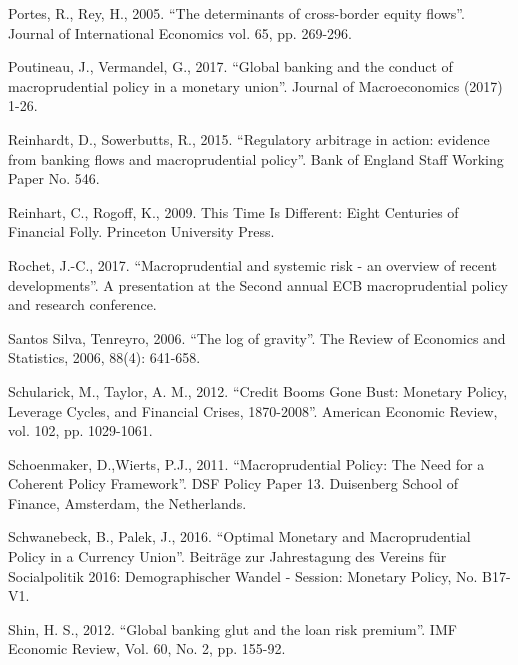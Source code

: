 \documentclass[12pt,a4paper]{article}
\begin{document}
Portes, R., Rey, H., 2005. “The determinants of cross-border equity flows”. Journal of International Economics vol. 65, pp. 269-296.

Poutineau, J., Vermandel, G., 2017. “Global banking and the conduct of macroprudential policy in a monetary union”. Journal of Macroeconomics (2017) 1-26.


Reinhardt, D., Sowerbutts, R., 2015. “Regulatory arbitrage in action: evidence from banking flows and macroprudential policy”. Bank of England Staff Working Paper No. 546.

Reinhart, C., Rogoff, K., 2009. This Time Is Different: Eight Centuries of Financial Folly. Princeton University Press.




Rochet, J.-C., 2017. “Macroprudential and systemic risk - an overview of recent developments”. A presentation at the Second annual ECB macroprudential policy and research conference. 

Santos Silva, Tenreyro, 2006. “The log of gravity”. The Review of Economics and Statistics, 2006, 88(4): 641-658.

Schularick, M., Taylor, A. M., 2012. “Credit Booms Gone Bust: Monetary Policy, Leverage Cycles, and Financial Crises, 1870-2008”. American Economic Review, vol. 102, pp. 1029-1061.

Schoenmaker, D.,Wierts, P.J., 2011. “Macroprudential Policy: The Need for a Coherent Policy Framework”. DSF Policy Paper 13. Duisenberg School of Finance, Amsterdam, the Netherlands.

Schwanebeck, B., Palek, J., 2016. “Optimal Monetary and Macroprudential Policy in a Currency Union”. Beiträge zur Jahrestagung des Vereins für Socialpolitik 2016: Demographischer Wandel - Session: Monetary Policy, No. B17-V1.

Shin, H. S., 2012. “Global banking glut and the loan risk premium”. IMF Economic Review, Vol. 60, No. 2, pp. 155-92.
\end{document}
